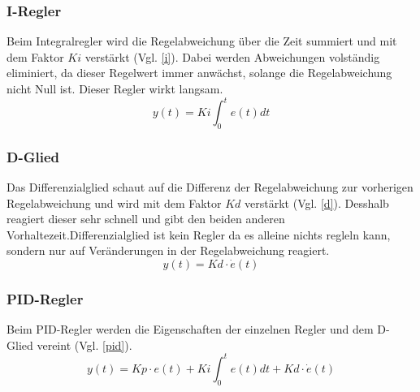 \documentclass[12pt,a4paper, ngerman]{article}
\begin{document}
\subsubsection{I-Regler}
Beim Integralregler wird die Regelabweichung über die Zeit summiert und mit dem Faktor $Ki$ verstärkt (Vgl. \ref{i}). Dabei werden Abweichungen volständig eliminiert, da dieser Regelwert immer anwächst, solange die Regelabweichung nicht Null ist. Dieser Regler wirkt langsam.\cite{website:rn-wissen_Regelungstechnik}\\
\begin{equation}\label{i}
y(t)=Ki\int_{0}^{t}e(t)dt
\end{equation}

\subsubsection{D-Glied}
Das Differenzialglied schaut auf die Differenz der Regelabweichung zur vorherigen Regelabweichung und wird mit dem Faktor $Kd$ verstärkt (Vgl. \ref{d}). Desshalb reagiert dieser sehr schnell und gibt den beiden anderen Vorhaltezeit.Differenzialglied ist kein Regler da es alleine nichts regleln kann, sondern nur auf Veränderungen in der Regelabweichung reagiert.\cite{website:rn-wissen_Regelungstechnik}\\
\begin{equation}\label{d}
y(t)=Kd\cdot \dot{e}(t)
\end{equation}

\subsubsection{PID-Regler}
Beim PID-Regler werden die Eigenschaften der einzelnen Regler und dem D-Glied vereint (Vgl. \ref{pid}).
\begin{equation}\label{pid}
y(t)=Kp\cdot e(t)+Ki\int_{0}^{t}e(t)dt+Kd\cdot \dot{e}(t)
\end{equation}
\newpage
\end{document}
